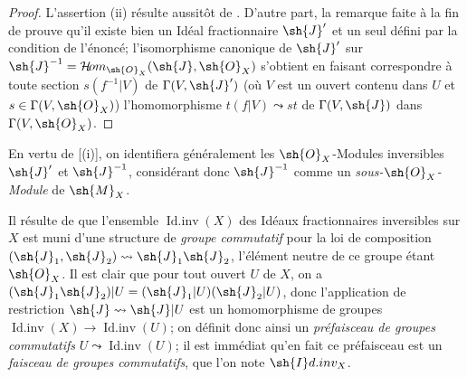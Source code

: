 \begin{proof}
L'assertion (ii) résulte aussitôt de .
D'autre part, la remarque faite à la fin de  prouve qu'il existe bien un Idéal fractionnaire $\sh{J}'$ et un seul défini par la condition de l'énoncé;
l'isomorphisme canonique de $\sh{J}'$ sur $\sh{J}^{-1}=\shHom_{\sh{O}_X}(\sh{J},\sh{O}_X)$ s'obtient en faisant correspondre à toute section $s(f^{-1}|V)$ de $\Gamma(V,\sh{J}')$ (où $V$ est un ouvert contenu dans $U$ et $s\in\Gamma(V,\sh{O}_X)$) l'homomorphisme $t(f|V)\leadsto st$ de $\Gamma(V,\sh{J})$ dans $\Gamma(V,\sh{O}_X)$.
\end{proof}

En vertu de [(i)], on identifiera généralement les $\sh{O}_X$-Modules inversibles $\sh{J}'$ et $\sh{J}^{-1}$, considérant donc $\sh{J}^{-1}$ comme un \emph{sous-$\sh{O}_X$-Module} de $\sh{M}_X$.

\begin{env}[21.2.4]
\label{IV.21.2.4}
Il résulte de  que l'ensemble $\operatorname{Id.inv}(X)$ des Idéaux fractionnaires inversibles sur $X$ est muni d'une structure de \emph{groupe commutatif} pour la loi de composition $(\sh{J}_1,\sh{J}_2)\leadsto\sh{J}_1\sh{J}_2$, l'élément neutre de ce groupe étant $\sh{O}_X$.
Il est clair que pour tout ouvert $U$ de $X$, on a $(\sh{J}_1\sh{J}_2)|U=(\sh{J}_1|U)(\sh{J}_2|U)$, donc l'application de restriction $\sh{J}\leadsto\sh{J}|U$ est un homomorphisme de groupes $\operatorname{Id.inv}(X)\to\operatorname{Id.inv}(U)$;
on définit donc ainsi un \emph{préfaisceau de groupes commutatifs} $U\leadsto\operatorname{Id.inv}(U)$;
il est immédiat qu'en fait ce préfaisceau est un \emph{faisceau de groupes commutatifs}, que l'on note $\sh{I}d.inv_X$.
\end{env}

